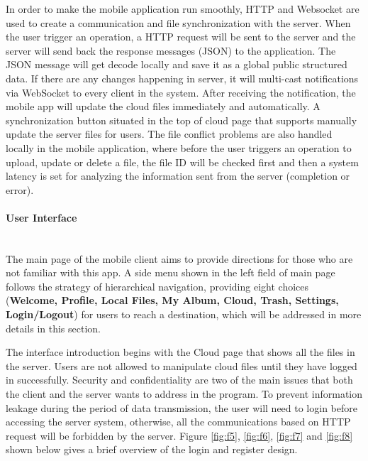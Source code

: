 \documentclass{article}
\begin{document}
In order to make the mobile application run smoothly, HTTP and Websocket are used to create a communication and file synchronization with the server. When the user trigger an operation, a HTTP request will be sent to the server and the server will send back the response messages (JSON) to the application. The JSON message will get decode locally and save it as  a global public structured data. If there are any changes happening in server, it will multi-cast notifications via WebSocket to every client in the system. After receiving the notification, the mobile app will update the cloud files immediately and automatically. A synchronization button situated in the top of cloud page that supports manually update the server files for users. The file conflict problems are also handled locally in the mobile application, where before the user triggers an operation to upload, update or delete a file, the file ID will be checked first and then a system latency is set for analyzing the information sent from the server (completion or error). 

\paragraph{User Interface}\mbox{} \\

The main page of the mobile client aims to provide directions for those who are not familiar with this app. A side menu shown in the left field of main page follows the strategy of hierarchical navigation, providing eight choices (\textbf{Welcome, Profile, Local Files, My Album, Cloud, Trash, Settings, Login/Logout}) for users to reach a destination, which will be addressed in more details in this section. 

The interface introduction begins with the Cloud page that shows all the files in the server. Users are not allowed to manipulate cloud files until they have logged in successfully. Security and confidentiality are two of the main issues that both the client and the server wants to address in the program. To prevent information leakage during the period of data transmission, the user will need to login before accessing the server system, otherwise, all the communications based on HTTP request will be forbidden by the server. Figure \ref{fig:f5}, \ref{fig:f6}, \ref{fig:f7} and \ref{fig:f8} shown below gives a brief overview of the login and register design.
\end{document}
